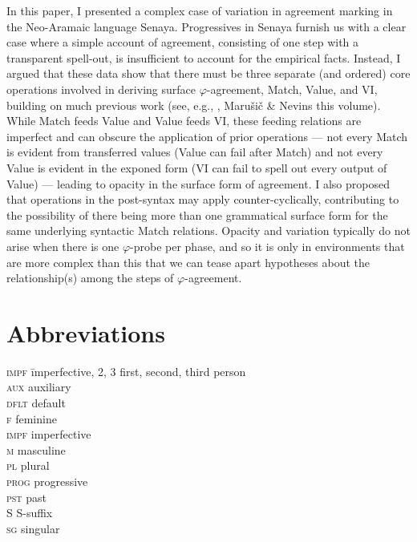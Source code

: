 \documentclass[output=paper
,modfonts
,nonflat]{langsci/langscibook}
\begin{document}
In this paper, I presented a complex case of variation in agreement marking in the Neo-Aramaic language Senaya. Progressives in Senaya furnish us with a clear case where a simple account of agreement, consisting of one step with a transparent spell-out, is insufficient to account for the empirical facts. Instead, I argued that these data show that there must be three separate (and ordered) core operations involved in deriving surface $\varphi$-agreement, Match, Value, and VI, building on much previous work (see, e.g., \citealt{vanKoppen07,BBP09,ArregiNevins12,BhattWalkow13,Bonet13,Marusicetal15, Smith17, AtlamazBakerTA}, Marušič \& Nevins this volume). While Match feeds Value and Value feeds VI, these feeding relations are imperfect and can obscure the application of prior operations --- not every Match is evident from transferred values (Value can fail after Match) and not every Value is evident in the exponed form (VI can fail to spell out every output of Value) --- leading to opacity in the surface form of agreement. I also proposed that operations in the post-syntax may apply counter-cyclically, contributing to the possibility of there being more than one grammatical surface form for the same underlying syntactic Match relations. Opacity and variation typically do not arise when there is one $\varphi$-probe per phase, and so it is only in environments that are more complex than this that we can tease apart hypotheses about the relationship(s) among the steps of $\varphi$-agreement.

\section*{Abbreviations}

\begin{multicols}{2}
	\begin{tabbing}
		\textsc{impf}\hspace{5mm} \= imperfective, 2, 3 \> first, second, third person\\
\textsc{aux} \> auxiliary\\
\textsc{dflt} \> default\\
 \textsc{f} \> feminine\\
\textsc{impf} \> imperfective\\
 \textsc{m} \> masculine\\
 \textsc{pl} \> plural\\
 \textsc{prog} \> progressive\\
 \textsc{pst} \> past\\
 S \> S-suffix\\
 \textsc{sg} \> singular\\
	\end{tabbing} 
\end{multicols}
\end{document}
